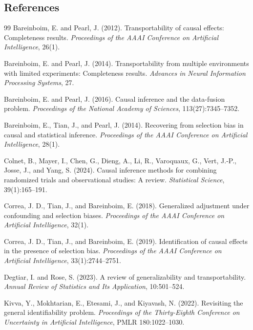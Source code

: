 \documentclass[11pt]{article}
\theoremstyle{definition}
\theoremstyle{plain}
\theoremstyle{remark}
\begin{document}
\subsection*{References}
\begin{thebibliography}{99}
Bareinboim, E. and Pearl, J. (2012).
Transportability of causal effects: Completeness results.
\emph{Proceedings of the AAAI Conference on Artificial Intelligence}, 26(1).

Bareinboim, E. and Pearl, J. (2014).
Transportability from multiple environments with limited experiments:
Completeness results.
\emph{Advances in Neural Information Processing Systems}, 27.

Bareinboim, E. and Pearl, J. (2016).
Causal inference and the data-fusion problem.
\emph{Proceedings of the National Academy of Sciences}, 113(27):7345--7352.

Bareinboim, E., Tian, J., and Pearl, J. (2014).
Recovering from selection bias in causal and statistical inference.
\emph{Proceedings of the AAAI Conference on Artificial Intelligence}, 28(1).

Colnet, B., Mayer, I., Chen, G., Dieng, A., Li, R., Varoquaux, G.,
Vert, J.-P., Josse, J., and Yang, S. (2024).
Causal inference methods for combining randomized trials and observational
studies: A review.
\emph{Statistical Science}, 39(1):165--191.

Correa, J. D., Tian, J., and Bareinboim, E. (2018).
Generalized adjustment under confounding and selection biases.
\emph{Proceedings of the AAAI Conference on Artificial Intelligence}, 32(1).

Correa, J. D., Tian, J., and Bareinboim, E. (2019).
Identification of causal effects in the presence of selection bias.
\emph{Proceedings of the AAAI Conference on Artificial Intelligence},
33(1):2744--2751.

Degtiar, I. and Rose, S. (2023).
A review of generalizability and transportability.
\emph{Annual Review of Statistics and Its Application}, 10:501--524.

Kivva, Y., Mokhtarian, E., Etesami, J., and Kiyavash, N. (2022).
Revisiting the general identifiability problem.
\emph{Proceedings of the Thirty-Eighth Conference on Uncertainty in
Artificial Intelligence}, PMLR 180:1022--1030.


\end{thebibliography}
\end{document}
